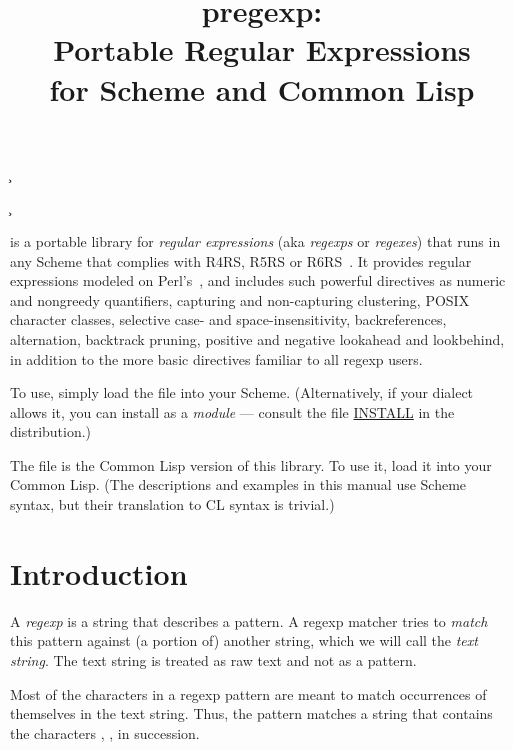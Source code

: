 

\title{pregexp: \\
Portable Regular Expressions \\
for Scheme and Common Lisp}

\ifx\shipout\UnDeFiNeD
\c{}
\fi

\c{}

\bigskip

\n {} is a portable library for {\em
regular expressions} (aka {\em regexps} or {\em
regexes}) that runs in any Scheme
that complies with R4RS, R5RS or R6RS~\cite{r6rs}.  It
provides regular expressions
modeled on
Perl's~\cite{friedl:regex,pperl}, and includes such
powerful directives as numeric and nongreedy
quantifiers, capturing and non-capturing clustering,
POSIX character classes, selective case- and
space-insensitivity, backreferences, alternation,
backtrack pruning,
positive and negative lookahead and lookbehind, in
addition to the more basic directives familiar to all
regexp users.

To use, simply load the file  into
your Scheme.
(Alternatively, if your dialect allows it, you can
install  as a {\em module} --- consult
the file \url{INSTALL} in the distribution.)

The file  is the Common Lisp version
of this library.  To use it, load it into your Common Lisp.
(The descriptions and examples in this manual use Scheme
syntax, but their
translation to CL syntax is trivial.)

\htmlonly


\tableofcontents
\endhtmlonly

\section{Introduction}

A {\em regexp} is a string that describes a pattern.  A
regexp matcher tries to {\em match} this pattern
against (a portion of) another string, which we
will call the {\em text string}.  The text string
is treated as raw text and not as a pattern.

Most of the characters in a regexp pattern are meant to
match occurrences of themselves in the text string.
Thus, the pattern  matches a string that
contains the characters , ,  in succession.

